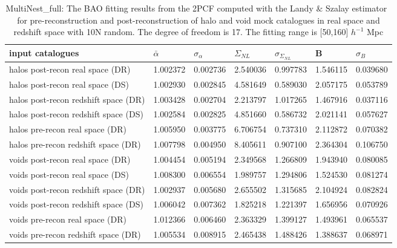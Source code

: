 \begin{table*}
\caption{MultiNest\_full: The BAO fitting results from the 2PCF computed with the Landy $\&$ Szalay estimator~\cite{Landy1993} for pre-reconstruction and  post-reconstruction of halo and void mock catalogues in real space and redshift space with 10N random. The degree of freedom is 17. The fitting range is [50,160] $h^{-1}$ Mpc}
\label{tab:LS}
\begin{tabular}{lllllll}
\hline
input catalogues                     &$\bar{\alpha}$&$\sigma_{\alpha}$&     $\Sigma_{NL}$ & $\sigma_{\Sigma_{NL}}$&      B   & $\sigma_B$  \\
\hline
halos post-recon real space (DR)     & 1.002372 & 0.002736 & 2.540036 & 0.997783 & 1.546115 & 0.039680 \\
halos post-recon real space (DS)     & 1.002930 & 0.002845 & 4.581649 & 0.589030 & 2.057175 & 0.053789 \\
halos post-recon redshift space (DR) & 1.003428 & 0.002704 & 2.213797 & 1.017265 & 1.467916 & 0.037116 \\
halos post-recon redshift space (DS) & 1.002584 & 0.002825 & 4.851660 & 0.586732 & 2.021141 & 0.057627 \\
halos pre-recon real space (DR)      & 1.005950 & 0.003775 & 6.706754 & 0.737310 & 2.112872 & 0.070382 \\
halos pre-recon redshift space (DR)  & 1.007798 & 0.004950 & 8.405611 & 0.907100 & 2.364304 & 0.106750 \\
\hline
voids post-recon real space (DR)     & 1.004454 & 0.005194 & 2.349568 & 1.266809 & 1.943940 & 0.080085 \\
voids post-recon real space (DS)     & 1.008300 & 0.006554 & 1.989757 & 1.294806 & 1.524530 & 0.081274 \\
voids post-recon redshift space (DR) & 1.002937 & 0.005680 & 2.655502 & 1.315685 & 2.104924 & 0.082824 \\
voids post-recon redshift space (DS) & 1.006042 & 0.007362 & 1.825218 & 1.221397 & 1.656956 & 0.070926 \\
voids pre-recon real space (DR)      & 1.012366 & 0.006460 & 2.363329 & 1.399127 & 1.493961 & 0.065537 \\
voids pre-recon redshift space (DR)  & 1.005534 & 0.008915 & 2.465438 & 1.488426 & 1.388637 & 0.068971 \\
\hline
\end{tabular}
\end{table*}


